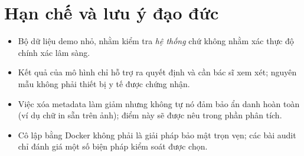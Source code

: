 \documentclass[11pt,a4paper]{article}
\begin{document}
\section{Hạn chế và lưu ý đạo đức}
\begin{itemize}
  \item Bộ dữ liệu demo nhỏ, nhằm kiểm tra \emph{hệ thống} chứ không nhằm xác thực độ chính xác lâm sàng.
  \item Kết quả của mô hình chỉ hỗ trợ ra quyết định và cần bác sĩ xem xét; nguyên mẫu không phải thiết bị y tế được chứng nhận.
  \item Việc xóa metadata làm giảm nhưng không tự nó đảm bảo ẩn danh hoàn toàn (ví dụ chữ in sẵn trên ảnh); điểm này sẽ được nêu trong phần phân tích.
  \item Cô lập bằng Docker không phải là giải pháp bảo mật trọn vẹn; các bài audit chỉ đánh giá một số biện pháp kiểm soát được chọn.
\end{itemize}
\end{document}
